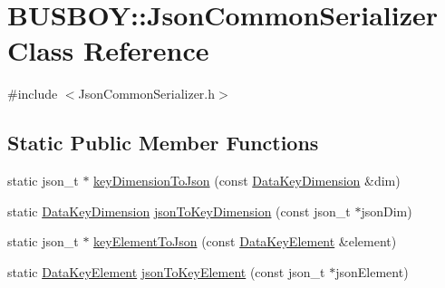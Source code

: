 \hypertarget{classBUSBOY_1_1JsonCommonSerializer}{
\section{BUSBOY::JsonCommonSerializer Class Reference}
\label{classBUSBOY_1_1JsonCommonSerializer}
}


{\ttfamily \#include $<$JsonCommonSerializer.h$>$}\subsection*{Static Public Member Functions}
\begin{DoxyCompactItemize}
\item 
static json\_\-t $\ast$ \hyperlink{classBUSBOY_1_1JsonCommonSerializer_a84be97d2ce2c6c4093e6711c3386c789}{keyDimensionToJson} (const \hyperlink{classBUSBOY_1_1DataKeyDimension}{DataKeyDimension} \&dim)
\item 
static \hyperlink{classBUSBOY_1_1DataKeyDimension}{DataKeyDimension} \hyperlink{classBUSBOY_1_1JsonCommonSerializer_a7508db323d150f335aa4295484797b41}{jsonToKeyDimension} (const json\_\-t $\ast$jsonDim)
\item 
static json\_\-t $\ast$ \hyperlink{classBUSBOY_1_1JsonCommonSerializer_ada75d0fa706d7506674352abf5848543}{keyElementToJson} (const \hyperlink{classBUSBOY_1_1DataKeyElement}{DataKeyElement} \&element)
\item 
static \hyperlink{classBUSBOY_1_1DataKeyElement}{DataKeyElement} \hyperlink{classBUSBOY_1_1JsonCommonSerializer_abdc3e20058d1224944ac1dd63be20ff3}{jsonToKeyElement} (const json\_\-t $\ast$jsonElement)
\end{DoxyCompactItemize}


